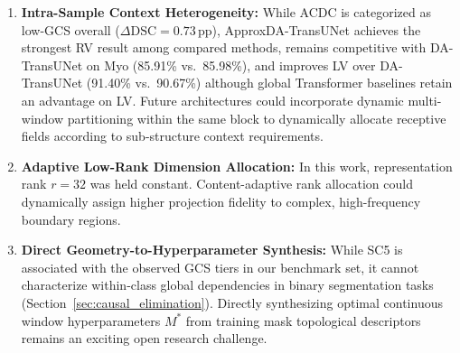 \begin{enumerate}
  \item \textbf{Intra-Sample Context Heterogeneity:} While ACDC is categorized as low-GCS overall ($\Delta\text{DSC} = 0.73$\,pp), ApproxDA-TransUNet achieves the strongest RV result among compared methods, remains competitive with DA-TransUNet on Myo (85.91\% vs.\ 85.98\%), and improves LV over DA-TransUNet (91.40\% vs.\ 90.67\%) although global Transformer baselines retain an advantage on LV. Future architectures could incorporate dynamic multi-window partitioning within the same block to dynamically allocate receptive fields according to sub-structure context requirements.
  \item \textbf{Adaptive Low-Rank Dimension Allocation:} In this work, representation rank $r{=}32$ was held constant. Content-adaptive rank allocation could dynamically assign higher projection fidelity to complex, high-frequency boundary regions.
  \item \textbf{Direct Geometry-to-Hyperparameter Synthesis:} While SC5 is associated with the observed GCS tiers in our benchmark set, it cannot characterize within-class global dependencies in binary segmentation tasks (Section~\ref{sec:causal_elimination}). Directly synthesizing optimal continuous window hyperparameters $M^*$ from training mask topological descriptors remains an exciting open research challenge.
\end{enumerate}